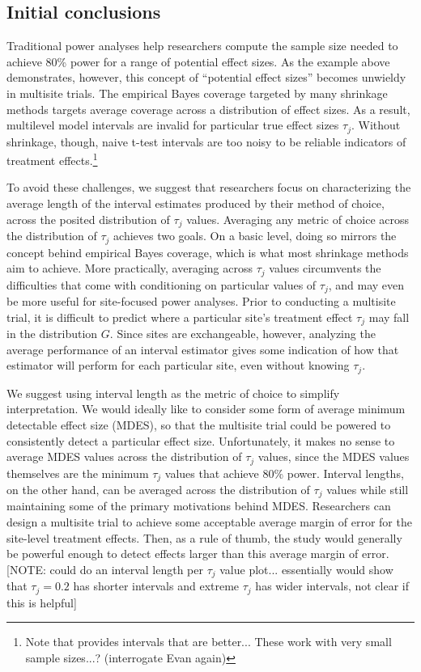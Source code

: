 \documentclass[]{article}
\begin{document}
\subsection{Initial conclusions}

Traditional power analyses help researchers compute the sample size needed to achieve 80\% power for a range of potential effect sizes.
As the example above demonstrates, however, this concept of ``potential effect sizes'' becomes unwieldy in multisite trials.
The empirical Bayes coverage targeted by many shrinkage methods targets average coverage across a distribution of effect sizes.
As a result, multilevel model intervals are invalid for particular true effect sizes $\tau_j$.
Without shrinkage, though, naive t-test intervals are too noisy to be reliable indicators of treatment effects.\footnote{Note that \cite{yu2018adaptive} provides intervals that are better... These work with very small sample sizes...? (interrogate Evan again)}

To avoid these challenges, we suggest that researchers focus on characterizing the average length of the interval estimates produced by their method of choice, across the posited distribution of $\tau_j$ values.
Averaging any metric of choice across the distribution of $\tau_j$ achieves two goals.
On a basic level, doing so mirrors the concept behind empirical Bayes coverage, which is what most shrinkage methods aim to achieve.
More practically, averaging across $\tau_j$ values circumvents the difficulties that come with conditioning on particular values of $\tau_j$, and may even be more useful for site-focused power analyses.
Prior to conducting a multisite trial, it is difficult to predict where a particular site's treatment effect $\tau_j$ may fall in the distribution $G$.
Since sites are exchangeable, however, analyzing the average performance of an interval estimator gives some indication of how that estimator will perform for each particular site, even without knowing $\tau_j$.

We suggest using interval length as the metric of choice to simplify interpretation.
We would ideally like to consider some form of average minimum detectable effect size (MDES), so that the multisite trial could be powered to consistently detect a particular effect size.
Unfortunately, it makes no sense to average MDES values across the distribution of $\tau_j$ values, since the MDES values themselves are the minimum $\tau_j$ values that achieve 80\% power.
Interval lengths, on the other hand, can be averaged across the distribution of $\tau_j$ values while still maintaining some of the primary motivations behind MDES.
Researchers can design a multisite trial to achieve some acceptable average margin of error for the site-level treatment effects.
Then, as a rule of thumb, the study would generally be powerful enough to detect effects larger than this average margin of error.
[NOTE: could do an interval length per $\tau_j$ value plot... essentially would show that $\tau_j=0.2$ has shorter intervals and extreme $\tau_j$ has wider intervals, not clear if this is helpful]
\end{document}
